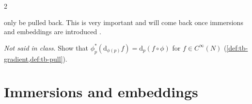 \begin{paracol}{2}
\begin{intuition}
only be pulled back. This is very important and will come back once immersions and embeddings are introduced    .
\end{intuition}
\begin{exercise}\label{ex:tb-pullback-df}
\emph{Not said in class.} Show that $\phi^*_p(\mathrm d_{\phi(p)}f)=\mathrm d_p(f\circ\phi)$ for $f\in C^\infty(N)$ (\cref{def:tb-gradient,def:tb-pull}).
\end{exercise}

\section{Immersions and embeddings}\label{sec:tb-immersion}


\end{paracol}
